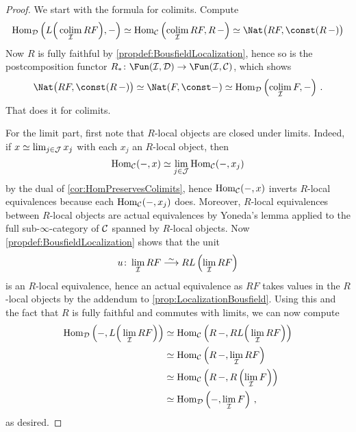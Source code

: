 \begin{proof}
	We start with the formula for colimits. Compute
	\begin{equation*}
		\Hom_\Dd\left(L\Big(\colimit_\Ii RF\Big),-\right)\simeq \Hom_\Cc\left(\colimit_\Ii RF,R\,-\right)\simeq \Nat\big(RF,\const (R\,-)\big)
	\end{equation*}
	Now $R$ is fully faithful by \cref{propdef:BousfieldLocalization}, hence so is the postcomposition functor $R_*\colon \Fun(\Ii,\Dd)\morphism\Fun(\Ii,\Cc)$, which shows
	\begin{equation*}
		\Nat\big(RF,\const (R\,-)\big)\simeq \Nat(F,\const-)\simeq \Hom_\Dd\left(\colimit_\Ii F,-\right)\,.\nopagebreak
	\end{equation*}
	That does it for colimits.
	
	For the limit part, first note that $R$-local objects are closed under limits. Indeed, if $x\simeq\operatorname*{lim}_{j\in \mathcal{J}}x_j$ with each $x_j$ an $R$-local object, then
	\begin{equation*}
		\operatorname{Hom}_{\mathcal{C}}(-,x)\simeq \operatorname*{lim}_{j\in \mathcal{J}}\operatorname{Hom}_{\mathcal{C}}(-,x_j)
	\end{equation*}
	by the dual of \cref{cor:HomPreservesColimits}, hence $\operatorname{Hom}_{\mathcal{C}}(-,x)$ inverts $R$-local equivalences because each $\operatorname{Hom}_{\mathcal{C}}(-,x_j)$ does. Moreover, $R$-local equivalences between $R$-local objects are actual equivalences by Yoneda's lemma applied to the full sub-$\infty$-category of $\mathcal{C}$ spanned by $R$-local objects. Now \cref{propdef:BousfieldLocalization} shows that the unit
	\begin{equation*}
		u\colon \limit_\Ii RF\isomorphism RL\left(\limit_\Ii RF\right)
	\end{equation*}
	is an $R$-local equivalence, hence an actual equivalence as $RF$ takes values in the $R$-local objects by the addendum to \cref{prop:LocalizationBousfield}. Using this and the fact that $R$ is fully faithful and commutes with limits, we can now compute
	\begin{align*}
		\Hom_\Dd\left(-,L\Big(\limit_\Ii RF\Big)\right)&\simeq \Hom_\Cc\left(R\,-,RL\Big(\limit_\Ii RF\Big)\right)\\
		&\simeq \Hom_\Cc\left(R\,-,\limit_\Ii RF\right)\\
		&\simeq \Hom_\Cc\left(R\,-,R\left(\limit_\Ii F\right)\right)\\
		&\simeq \Hom_\Dd\left(-,\limit_\Ii F\right)\,,%
	\end{align*}
	as desired.
\end{proof}
